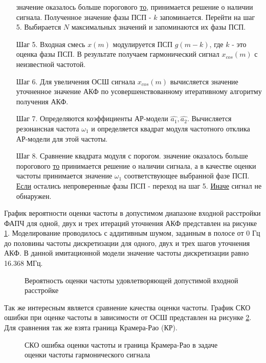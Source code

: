 \begin{itemize}
	  значение оказалось больше порогового {\underline{то}},
		принимается решение о наличии сигнала. Полученное значение фазы ПСП  - ${k}$ запоминается.
		Перейти на шаг 5.
		Выбирается ${N}$ максимальных значений и запоминаются их фазы ПСП.
\item[Шаг 5.] Входная смесь ${x(m)}$ модулируется ПСП ${g(m-k)}$, где ${k}$ - это оценка фазы ПСП. В результате получаем гармонический
	сигнал ${x_{cos}(m)}$ с неизвестной частотой.
\item[Шаг 6.] Для увеличения ОСШ сигнала ${x_{cos}(m)}$ вычисляется значение уточненное значение АКФ
	по усовершенствованному итеративному алгоритму получения АКФ.
\item[Шаг 7.] Определяются коэффициенты АР-модели ${\hat{a_1}, \hat{a_2}}$.
	Вычисляется резонансная частота ${\omega_1}$ и определяется квадрат модуля частотного отклика АР-модели для этой частоты. 
\item[Шаг 8.]
	Сравнение квадрата модуля с порогом.
          значение оказалось больше порогового {\underline{то}} 
                принимается решение о наличии сигнала, а в качестве оценки
                частоты принимается значение ${\omega_1}$ соответствующее выбранной фазе ПСП. 
		\subsubitem\underline{Если} остались непроверенные фазы ПСП - переход на шаг 5.
		\subsubitem\underline{Иначе} сигнал не обнаружен.
\end{itemize}

График вероятности оценки частоты в допустимом диапазоне входной расстройки ФАПЧ для одной, двух и трех итераций уточнения АКФ представлен на рисунке
\ref{pic:ar_dma_probability}. Моделирование проводилось с аддитивным шумом, заданным в полосе от 0 Гц до
половины частоты дискретизации для одного, двух и трех шагов уточнения АКФ. В данной имитационной модели значение частоты дискретизации равно 16.368 МГц.
\begin{figure}[h]
\center{}
	\caption{Вероятность оценки частоты удовлетворяющей допустимой входной расстройке}
	\label{pic:ar_dma_probability}
\end{figure}

Так же интересным является сравнение качества оценки частоты. График СКО ошибки при оценке частоты в зависимости
от ОСШ представлен на рисунке \ref{pic:crlb_vs_snr}. Для сравнения так же взята граница Крамера-Рао (КР).
\begin{figure}[h]
\center{}
	\caption{СКО ошибка оценки частоты и граница Крамера-Рао в задаче оценки частоты гармонического сигнала}
	\label{pic:crlb_vs_snr}
\end{figure}

